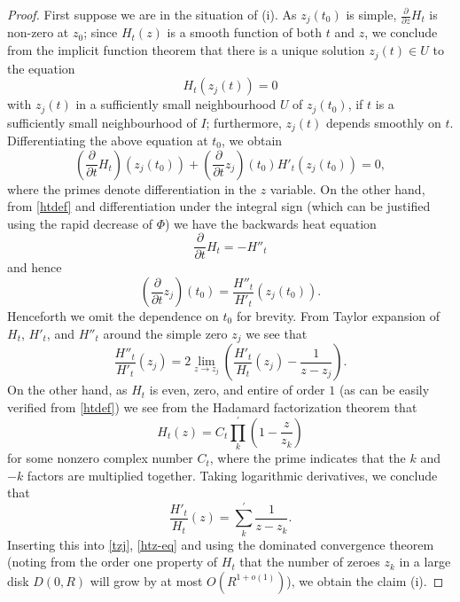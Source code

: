 \begin{proof}  First suppose we are in the situation of (i).  As $z_j(t_0)$ is simple, $\frac{\partial}{\partial z} H_t$ is non-zero at $z_0$; since $H_t(z)$ is a smooth function of both $t$ and $z$, we conclude from the implicit function theorem that there is a unique solution $z_j(t) \in U$ to the equation
$$ H_t( z_j(t) ) = 0$$
with $z_j(t)$ in a sufficiently small neighbourhood $U$ of $z_j(t_0)$, if $t$ is a sufficiently small neighbourhood of $I$; furthermore, $z_j(t)$ depends smoothly on $t$.  Differentiating the above equation at $t_0$, we obtain
$$ \left(\frac{\partial}{\partial t} H_t\right)( z_j(t_0) ) + \left(\frac{\partial}{\partial t} z_j\right)(t_0) H'_t(z_j(t_0)) = 0,$$
where the primes denote differentiation in the $z$ variable.
On the other hand, from \eqref{htdef} and differentiation under the integral sign (which can be justified using the rapid decrease of $\Phi$) we have the backwards heat equation
\begin{equation}\label{back}
\frac{\partial}{\partial t} H_t = -H''_t
\end{equation}
and hence
\begin{equation}\label{tzj}
\left(\frac{\partial}{\partial t} z_j\right)(t_0)  = \frac{H''_t}{H'_t}( z_j(t_0) ).
\end{equation}
Henceforth we omit the dependence on $t_0$ for brevity.  From Taylor expansion of $H_t$, $H'_t$, and $H''_t$ around the simple zero $z_j$ we see that
\begin{equation}\label{htz-eq}
 \frac{H''_t}{H'_t}( z_j) = 2 \lim_{z \to z_j}\left(  \frac{H'_t}{H_t}( z_j) - \frac{1}{z-z_j} \right).
\end{equation}
On the other hand, as $H_t$ is even, zero, and entire of order $1$ (as can be easily verified from \eqref{htdef}) we see from the Hadamard factorization theorem that
$$ H_t(z) = C_t \prod_k^{\prime} \left(1 - \frac{z}{z_k}\right)$$
for some nonzero complex number $C_t$, where the prime indicates that the $k$ and $-k$ factors are multiplied together.  Taking logarithmic derivatives, we conclude that
$$ \frac{H'_t}{H_t}(z) = \sum_k^{\prime} \frac{1}{z-z_k}.$$
Inserting this into \eqref{tzj}, \eqref{htz-eq} and using the dominated convergence theorem (noting from the order one property of $H_t$ that the number of zeroes $z_k$ in a large disk $D(0,R)$ will grow by at most $O(R^{1+o(1)})$), we obtain the claim (i).


\end{proof}
